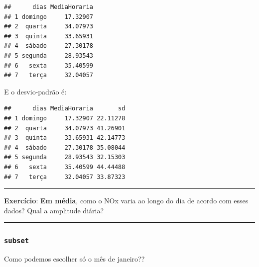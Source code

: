 \documentclass[]{book}
\newenvironment{Shaded}{\begin{snugshade}}{\end{snugshade}}
\newcommand{\KeywordTok}[1]{\textcolor[rgb]{0.13,0.29,0.53}{\textbf{#1}}}
\newcommand{\DataTypeTok}[1]{\textcolor[rgb]{0.13,0.29,0.53}{#1}}
\newcommand{\StringTok}[1]{\textcolor[rgb]{0.31,0.60,0.02}{#1}}
\newcommand{\CommentTok}[1]{\textcolor[rgb]{0.56,0.35,0.01}{\textit{#1}}}
\newcommand{\OperatorTok}[1]{\textcolor[rgb]{0.81,0.36,0.00}{\textbf{#1}}}
\newcommand{\NormalTok}[1]{#1}
\theoremstyle{definition}
\theoremstyle{definition}
\theoremstyle{definition}
\theoremstyle{remark}
\begin{document}
\begin{verbatim}
##      dias MediaHoraria
## 1 domingo     17.32907
## 2  quarta     34.07973
## 3  quinta     33.65931
## 4  sábado     27.30178
## 5 segunda     28.93543
## 6   sexta     35.40599
## 7   terça     32.04057
\end{verbatim}

E o desvio-padrão é:

\begin{Shaded}
\end{Shaded}

\begin{verbatim}
##      dias MediaHoraria       sd
## 1 domingo     17.32907 22.11278
## 2  quarta     34.07973 41.26901
## 3  quinta     33.65931 42.14773
## 4  sábado     27.30178 35.08044
## 5 segunda     28.93543 32.15303
## 6   sexta     35.40599 44.44488
## 7   terça     32.04057 33.87323
\end{verbatim}

\begin{center}\rule{0.5\linewidth}{\linethickness}\end{center}

{\textbf{Exercício}: \textbf{Em média}, como o NOx varia ao longo do dia
de acordo com esses dados? Qual a amplitude diária?}

\begin{center}\rule{0.5\linewidth}{\linethickness}\end{center}

\subsubsection{\texorpdfstring{\texttt{subset}}{subset}}\label{subset}

Como podemos escolher só o mês de janeiro??

\begin{Shaded}
\end{Shaded}
\end{document}
